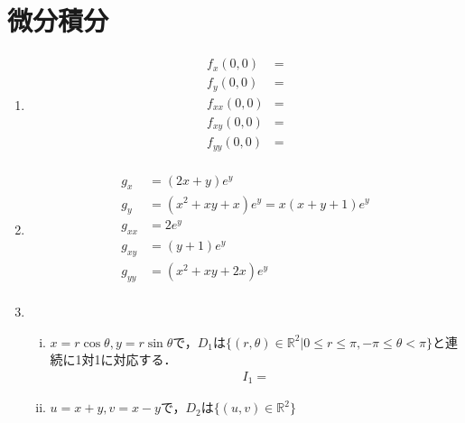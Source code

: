 \documentclass{jsarticle}
\begin{document}
\newpage
\section{微分積分}
\begin{enumerate}[(1)]
  \item 
  \begin{align*}
    f_x(0,0) &= \\
    f_y(0,0) &= \\
    f_{xx}(0,0) &= \\
    f_{xy}(0,0) &= \\
    f_{yy}(0,0) &= \\
  \end{align*}

  \item 
  \begin{align*}
    g_x &= (2x+y)e^y \\
    g_y &= (x^2 + xy + x)e^y=x(x + y + 1)e^y\\
    g_{xx} &= 2e^y\\
    g_{xy} &= (y + 1)e^y\\
    g_{yy} &= (x^2 + xy + 2x)e^y\\
  \end{align*}
  \item 
  \begin{enumerate}[(i)]
    \item $x=r\cos\theta, y=r\sin\theta$で，$D_1$は$\{(r,\theta)\in\mathbb{R}^2| 0\leq r\leq \pi,-\pi \leq \theta < \pi\}$と連続に1対1に対応する．
    \begin{align*}
      I_1 =   
    \end{align*}

    \item $u = x + y, v = x-y$で，$D_2$は$\{(u,v)\in\mathbb{R}^2\}$
  \end{enumerate}
\end{enumerate}
\end{document}
